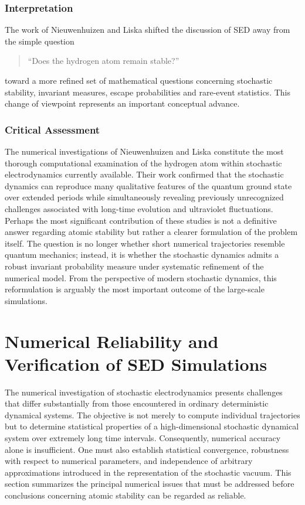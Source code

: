 \subsubsection{Interpretation}
The work of Nieuwenhuizen and Liska shifted the discussion of SED away
from the simple question
\begin{quote}
``Does the hydrogen atom remain stable?''
\end{quote}
toward a more refined set of mathematical questions concerning
stochastic stability, invariant measures, escape probabilities and
rare-event statistics.
This change of viewpoint represents an important conceptual advance.
\subsubsection*{Critical Assessment}
The numerical investigations of Nieuwenhuizen and Liska constitute the
most thorough computational examination of the hydrogen atom within
stochastic electrodynamics currently available. Their work confirmed
that the stochastic dynamics can reproduce many qualitative features of
the quantum ground state over extended periods while simultaneously
revealing previously unrecognized challenges associated with long-time
evolution and ultraviolet fluctuations.
Perhaps the most significant contribution of these studies is not a
definitive answer regarding atomic stability but rather a clearer
formulation of the problem itself. The question is no longer whether
short numerical trajectories resemble quantum mechanics; instead, it is
whether the stochastic dynamics admits a robust invariant probability
measure under systematic refinement of the numerical model.
From the perspective of modern stochastic dynamics, this reformulation
is arguably the most important outcome of the large-scale simulations.
\section{Numerical Reliability and Verification of SED Simulations}
\label{sec:NumericalReliability}
The numerical investigation of stochastic electrodynamics presents
challenges that differ substantially from those encountered in ordinary
deterministic dynamical systems. The objective is not merely to compute
individual trajectories but to determine statistical properties of a
high-dimensional stochastic dynamical system over extremely long time
intervals.
Consequently, numerical accuracy alone is insufficient. One must also
establish statistical convergence, robustness with respect to numerical
parameters, and independence of arbitrary approximations introduced in
the representation of the stochastic vacuum.
This section summarizes the principal numerical issues that must be
addressed before conclusions concerning atomic stability can be regarded
as reliable.

